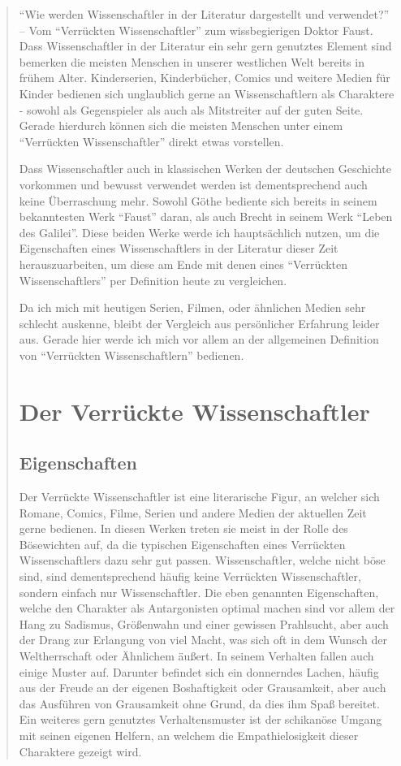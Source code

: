 \documentclass[12pt]{scrreprt}
\begin{document}
\blockquote{
\enquote{Wie werden Wissenschaftler in der Literatur dargestellt und verwendet?} – Vom \enquote{Verrückten Wissenschaftler} zum wissbegierigen Doktor Faust.
\smallskip\newline
Dass Wissenschaftler in der Literatur ein sehr gern genutztes Element sind bemerken die meisten Menschen in unserer westlichen Welt bereits in frühem Alter. 
Kinderserien, Kinderbücher, Comics und weitere Medien für Kinder bedienen sich unglaublich gerne an Wissenschaftlern als Charaktere - sowohl als Gegenspieler als auch als Mitstreiter auf der guten Seite.
Gerade hierdurch können sich die meisten Menschen unter einem \enquote{Verrückten Wissenschaftler} direkt etwas vorstellen.

Dass Wissenschaftler auch in klassischen Werken der deutschen Geschichte vorkommen und bewusst verwendet werden ist dementsprechend auch keine Überraschung mehr.
Sowohl Göthe bediente sich bereits in seinem bekanntesten Werk \enquote{Faust} daran, als auch Brecht in seinem Werk \enquote{Leben des Galilei}.
Diese beiden Werke werde ich hauptsächlich nutzen, um die Eigenschaften eines Wissenschaftlers in der Literatur dieser Zeit herauszuarbeiten, um diese am Ende mit denen eines \enquote{Verrückten Wissenschaftlers} per Definition heute zu vergleichen.

Da ich mich mit heutigen Serien, Filmen, oder ähnlichen Medien sehr schlecht auskenne, bleibt der Vergleich aus persönlicher Erfahrung leider aus.
Gerade hier werde ich mich vor allem an der allgemeinen Definition von \enquote{Verrückten Wissenschaftlern} bedienen.

\chapter{Der Verrückte Wissenschaftler}
	\label{chap:der verrückte Wissenschaftler}
\section{Eigenschaften}
	\label{sec:eigenschaften}
Der Verrückte Wissenschaftler ist eine literarische Figur, an welcher sich Romane, Comics, Filme, Serien und andere Medien der aktuellen Zeit gerne bedienen.
In diesen Werken treten sie meist in der Rolle des Bösewichten auf, da die typischen Eigenschaften eines Verrückten Wissenschaftlers dazu sehr gut passen.
Wissenschaftler, welche nicht böse sind, sind dementsprechend häufig keine Verrückten Wissenschaftler, sondern einfach nur Wissenschaftler. 
Die eben genannten Eigenschaften, welche den Charakter als Antargonisten optimal machen sind vor allem der Hang zu Sadismus, Größenwahn und einer gewissen Prahlsucht, aber auch der Drang zur Erlangung von viel Macht, was sich oft in dem Wunsch der Weltherrschaft oder Ähnlichem äußert.
In seinem Verhalten fallen auch einige Muster auf.
Darunter befindet sich ein donnerndes Lachen, häufig aus der Freude an der eigenen Boshaftigkeit oder Grausamkeit, aber auch das Ausführen von Grausamkeit ohne Grund, da dies ihm Spaß bereitet.
Ein weiteres gern genutztes Verhaltensmuster ist der schikanöse Umgang mit seinen eigenen Helfern, an welchem die Empathielosigkeit dieser Charaktere gezeigt wird.
}
\end{document}
